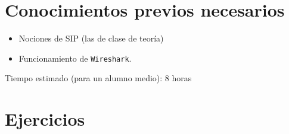 \documentclass[11pt,a4paper]{article}
\begin{document}
\section{Conocimientos previos necesarios}

\begin{itemize}
  \item Nociones de SIP (las de clase de teoría)
  \item Funcionamiento de \texttt{Wireshark}.
\end{itemize}

Tiempo estimado (para un alumno medio): 8 horas


\section{Ejercicios}
\end{document}
